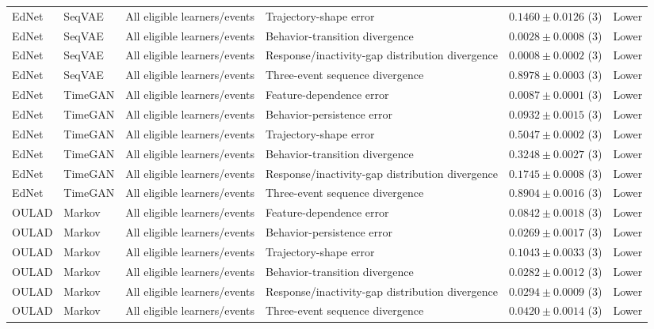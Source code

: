 \begin{longtable}{@{}p{2.25cm}p{2.05cm}p{4.7cm}p{5.0cm}p{2.6cm}p{1.25cm}@{}}
EdNet & SeqVAE & All eligible learners/events & Trajectory-shape error & $0.1460 \mathbin{\pm} 0.0126$ (3) & Lower \\
EdNet & SeqVAE & All eligible learners/events & Behavior-transition divergence & $0.0028 \mathbin{\pm} 0.0008$ (3) & Lower \\
EdNet & SeqVAE & All eligible learners/events & Response/inactivity-gap distribution divergence & $0.0008 \mathbin{\pm} 0.0002$ (3) & Lower \\
EdNet & SeqVAE & All eligible learners/events & Three-event sequence divergence & $0.8978 \mathbin{\pm} 0.0003$ (3) & Lower \\
EdNet & TimeGAN & All eligible learners/events & Feature-dependence error & $0.0087 \mathbin{\pm} 0.0001$ (3) & Lower \\
EdNet & TimeGAN & All eligible learners/events & Behavior-persistence error & $0.0932 \mathbin{\pm} 0.0015$ (3) & Lower \\
EdNet & TimeGAN & All eligible learners/events & Trajectory-shape error & $0.5047 \mathbin{\pm} 0.0002$ (3) & Lower \\
EdNet & TimeGAN & All eligible learners/events & Behavior-transition divergence & $0.3248 \mathbin{\pm} 0.0027$ (3) & Lower \\
EdNet & TimeGAN & All eligible learners/events & Response/inactivity-gap distribution divergence & $0.1745 \mathbin{\pm} 0.0008$ (3) & Lower \\
EdNet & TimeGAN & All eligible learners/events & Three-event sequence divergence & $0.8904 \mathbin{\pm} 0.0016$ (3) & Lower \\
OULAD & Markov & All eligible learners/events & Feature-dependence error & $0.0842 \mathbin{\pm} 0.0018$ (3) & Lower \\
OULAD & Markov & All eligible learners/events & Behavior-persistence error & $0.0269 \mathbin{\pm} 0.0017$ (3) & Lower \\
OULAD & Markov & All eligible learners/events & Trajectory-shape error & $0.1043 \mathbin{\pm} 0.0033$ (3) & Lower \\
OULAD & Markov & All eligible learners/events & Behavior-transition divergence & $0.0282 \mathbin{\pm} 0.0012$ (3) & Lower \\
OULAD & Markov & All eligible learners/events & Response/inactivity-gap distribution divergence & $0.0294 \mathbin{\pm} 0.0009$ (3) & Lower \\
OULAD & Markov & All eligible learners/events & Three-event sequence divergence & $0.0420 \mathbin{\pm} 0.0014$ (3) & Lower \\

\end{longtable}
